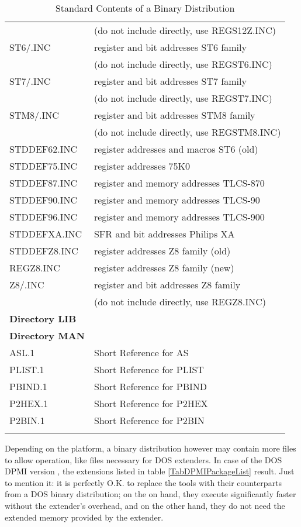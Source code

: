 \documentclass[12pt,twoside]{report}
\begin{document}
\begin{center}
\begin{longtable}{|l|l|}
                  & (do not include directly, use REGS12Z.INC) \\
ST6/\*.INC        & register and bit addresses ST6 family \\
                  & (do not include directly, use REGST6.INC) \\
ST7/\*.INC        & register and bit addresses ST7 family \\
                  & (do not include directly, use REGST7.INC) \\
STM8/\*.INC       & register and bit addresses STM8 family \\
                  & (do not include directly, use REGSTM8.INC) \\
STDDEF62.INC      & register addresses and macros ST6 (old)\\
STDDEF75.INC      & register addresses 75K0 \\
STDDEF87.INC      & register and memory addresses TLCS-870 \\
STDDEF90.INC      & register and memory addresses TLCS-90 \\
STDDEF96.INC      & register and memory addresses TLCS-900 \\
STDDEFXA.INC      & SFR and bit addresses Philips XA \\
STDDEFZ8.INC      & register addresses Z8 family (old) \\
REGZ8.INC         & register addresses Z8 family (new) \\
Z8/\*.INC         & register and bit addresses Z8 family \\
                  & (do not include directly, use REGZ8.INC) \\
\hline
{\bf Directory LIB} & \\
\hline
{\bf Directory MAN} & \\
\hline
ASL.1             & Short Reference for AS \\
PLIST.1           & Short Reference for PLIST \\
PBIND.1           & Short Reference for PBIND \\
P2HEX.1           & Short Reference for P2HEX \\
P2BIN.1           & Short Reference for P2BIN \\
\hline
\caption{Standard Contents of a Binary Distribution
         \label{TabCommonPackageList}}
\end{longtable}\end{center}


Depending on the platform, a binary distribution however may contain more
files to allow operation, like files necessary for DOS extenders. In case
of the DOS DPMI version , the extensions listed in
table \ref{TabDPMIPackageList} result.  Just to mention it: it is
perfectly O.K. to replace the tools with their counterparts from a DOS
binary distribution; on the on hand, they execute significantly faster
without the extender's overhead, and on the other hand, they do not need
the extended memory provided by the extender.
\end{document}
